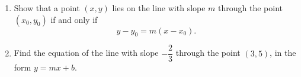 \begin{enumerate}
\item[(a)] Show that a point $(x,y)$ lies on the line with slope $m$ through the point $\left(x_0,y_0\right)$ if and only if
\[y-y_0=m\left(x-x_0\right).\]
\item[(b)] Find the equation of the line with slope $-\dfrac23$ through the point $(3,5)$, in the form $y=mx+b$.
\end{enumerate}
